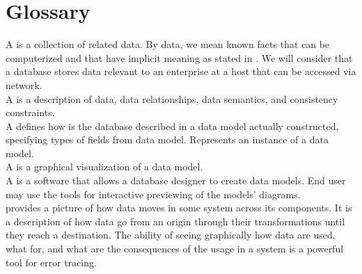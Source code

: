 \section{Glossary}
A  is a collection of related data. By data, we mean known facts that can be computerized and that have implicit meaning as stated in  \cite{ElmasryNavathe15}. We will consider that a database stores data relevant to an enterprise at a host that can be accessed via network. \\

A  is a description of data, data relationships, data semantics, and consistency constraints. \label{DataModel} \\
 
A  defines how is the database described in a data model actually constructed, specifying types of fields from data model. Represents an instance of a data model. \\

A  is a graphical visualization of a data model. \\

A  is a software that allows a database designer to create data models. End user may use the tools for interactive previewing of the models' diagrams. \\

 provides a picture of how data moves in some system across its components. It is a description of how data go from an origin through their transformations until they reach a destination. 
The ability of seeing graphically how data are used, what for, and what are the consequences of the usage in a system is a powerful tool for error tracing. \\

